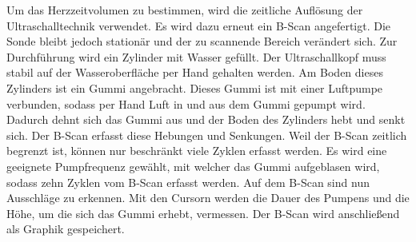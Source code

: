 Um das Herzzeitvolumen zu bestimmen, wird die zeitliche Auflösung der Ultraschalltechnik verwendet. 
Es wird dazu erneut ein B-Scan angefertigt. Die Sonde bleibt jedoch stationär und der zu scannende 
Bereich verändert sich. Zur Durchführung wird ein Zylinder mit Wasser gefüllt. Der Ultraschallkopf 
muss stabil auf der Wasseroberfläche per Hand gehalten werden. Am Boden dieses 
Zylinders ist ein Gummi angebracht. Dieses Gummi ist mit einer Luftpumpe verbunden, sodass per Hand 
Luft in und aus dem Gummi gepumpt wird. Dadurch dehnt sich das Gummi aus und der Boden des Zylinders 
hebt und senkt sich. Der B-Scan erfasst diese Hebungen und Senkungen. Weil der B-Scan zeitlich 
begrenzt ist, können nur beschränkt viele Zyklen erfasst werden. Es wird eine geeignete Pumpfrequenz 
gewählt, mit welcher das Gummi aufgeblasen wird, sodass zehn Zyklen vom B-Scan erfasst werden. Auf 
dem B-Scan sind nun Ausschläge zu erkennen. Mit den Cursorn werden die Dauer des Pumpens und die Höhe, um 
die sich das Gummi erhebt, vermessen. Der B-Scan wird anschließend als Graphik gespeichert.




%

